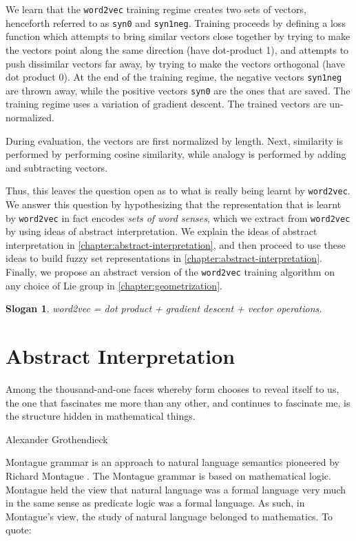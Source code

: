 \documentclass[11pt]{book}
\newtheorem{slogan}{Slogan}
\begin{document}
We learn that the \texttt{word2vec} training regime creates two sets of
vectors, henceforth referred to as \texttt{syn0} and \texttt{syn1neg}. Training proceeds
by defining a loss function which attempts to bring similar vectors close together by trying
to make the vectors point along the same direction (have dot-product 1),
and attempts to push dissimilar vectors far away, by trying to make the vectors
orthogonal (have dot product 0). At the end of the training regime, the
negative vectors \texttt{syn1neg} are thrown away, while the positive vectors
\texttt{syn0} are the ones that are saved. The training regime uses a
variation of gradient descent. The trained vectors are un-normalized.

During evaluation, the vectors are first normalized by length. Next,
similarity is performed by performing cosine similarity, while analogy 
is performed by adding and subtracting vectors. 

Thus, this leaves the question open as to what is really being learnt by
\texttt{word2vec}. We answer this question by hypothesizing that the
representation that is learnt by \texttt{word2vec} in fact encodes \emph{sets
of word senses}, which we extract from \texttt{word2vec} by using ideas of
abstract interpretation. We explain the ideas of abstract interpretation in
\autoref{chapter:abstract-interpretation}, and then proceed to use these ideas
to build fuzzy set representations in
\autoref{chapter:abstract-interpretation}. Finally, we propose an abstract
version of the \texttt{word2vec} training algorithm on any choice of Lie group
in \autoref{chapter:geometrization}.

\begin{slogan}
    word2vec = dot product + gradient descent + vector operations.
\end{slogan}

\chapter{Abstract Interpretation}
\label{chapter:abstract-interpretation}
\epigraph{Among the thousand-and-one faces whereby form chooses to reveal itself to us, the one that fascinates me more than any other, and continues to fascinate me, is the structure hidden in mathematical things.}{Alexander Grothendieck}


Montague grammar is an approach to natural language semantics pioneered by
Richard Montague \cite{sep-montague-semantics}. The Montague grammar is based
on mathematical logic.  Montague held the view that natural language was a
formal language very much in the same sense as predicate logic was a formal
language. As such, in Montague’s view, the study of natural language belonged
to mathematics. To quote:
\end{document}
